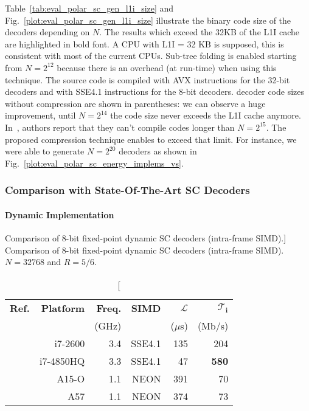 Table~\ref{tab:eval_polar_sc_gen_l1i_size} and
Fig.~\ref{plot:eval_polar_sc_gen_l1i_size} illustrate the binary code size of
the decoders depending on $N$. The results which exceed the 32KB of the L1I
cache are highlighted in bold font. A CPU with L1I = 32 KB is supposed, this is
consistent with most of the current CPUs. Sub-tree folding is enabled starting
from $N=2^{12}$ because there is an overhead (at run-time) when using this
technique. The source code is compiled with AVX instructions for the 32-bit
decoders and with SSE4.1 instructions for the 8-bit decoders. \AFFECT decoder
code sizes without compression are shown in parentheses: we can observe a huge
improvement, until $N=2^{14}$ the code size never exceeds the L1I cache anymore.
In~\cite{Giard2016b}, authors report that they can't compile codes longer than
$N = 2^{15}$. The proposed compression technique enables to exceed that limit.
For instance, we were able to generate $N = 2^{20}$ decoders as shown in
Fig.~\ref{plot:eval_polar_sc_energy_implems_vs}.

\subsubsection{Comparison with State-Of-The-Art SC Decoders}

\paragraph{Dynamic Implementation}

\begin{table}[htp]
  \centering
  \caption
    [Comparison of 8-bit fixed-point dynamic SC decoders (intra-frame SIMD).]
    {Comparison of 8-bit fixed-point dynamic SC decoders (intra-frame SIMD).
     $N = 32768$ and $R = 5/6$.}
  \label{tab:eval_polar_energy_comparison}
  \begin{tabular}{r r r r r r}
    \textbf{Ref.}        & \textbf{Platform} & \textbf{Freq.} & \textbf{SIMD} & $\bm{\mathcal{L}}$ & $\bm{\mathcal{T}_i}$ \\
                         &                   &          (GHz) &               &           ($\mu$s) &               (Mb/s) \\
    \hline
    \hline
    \cite{Giard2014}     &           i7-2600 &            3.4 &        SSE4.1 &                135 &                 204  \\
    \cite{Cassagne2016b} &         i7-4850HQ &            3.3 &        SSE4.1 &                 47 &         \textbf{580} \\
    \cite{Cassagne2016b} &             A15-O &            1.1 &          NEON &                391 &                  70  \\
    \cite{Cassagne2016b} &               A57 &            1.1 &          NEON &                374 &                  73  \\
  \end{tabular}
\end{table}

